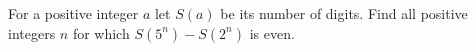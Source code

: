 For a positive integer $a$ let $S(a)$ be its number of digits. Find all positive integers $n$ for which $S\left(5^n\right)-S\left(2^n\right)$ is even.
